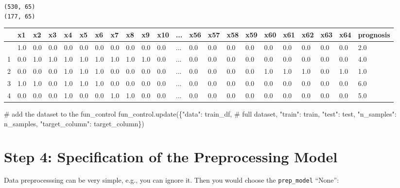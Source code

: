 \documentclass[
  letterpaper,
  DIV=11,
  numbers=noendperiod]{scrreprt}
\newenvironment{Shaded}{\begin{snugshade}}{\end{snugshade}}
\newcommand{\CommentTok}[1]{\textcolor[rgb]{0.37,0.37,0.37}{#1}}
\newcommand{\NormalTok}[1]{\textcolor[rgb]{0.00,0.23,0.31}{#1}}
\newcommand{\StringTok}[1]{\textcolor[rgb]{0.13,0.47,0.30}{#1}}
\begin{document}
\begin{verbatim}
(530, 65)
(177, 65)
\end{verbatim}

\begin{longtable}[]{@{}llllllllllllllllllllll@{}}
\toprule\noalign{}
& x1 & x2 & x3 & x4 & x5 & x6 & x7 & x8 & x9 & x10 & ... & x56 & x57 &
x58 & x59 & x60 & x61 & x62 & x63 & x64 & prognosis \\
\midrule\noalign{}
\endhead
\bottomrule\noalign{}
\endlastfoot
0 & 1.0 & 0.0 & 0.0 & 0.0 & 0.0 & 0.0 & 0.0 & 0.0 & 0.0 & 0.0 & ... &
0.0 & 0.0 & 0.0 & 0.0 & 0.0 & 0.0 & 0.0 & 0.0 & 0.0 & 2.0 \\
1 & 0.0 & 1.0 & 1.0 & 1.0 & 1.0 & 1.0 & 1.0 & 1.0 & 1.0 & 0.0 & ... &
0.0 & 0.0 & 0.0 & 0.0 & 0.0 & 0.0 & 0.0 & 0.0 & 0.0 & 4.0 \\
2 & 0.0 & 0.0 & 0.0 & 1.0 & 1.0 & 1.0 & 0.0 & 0.0 & 0.0 & 0.0 & ... &
0.0 & 0.0 & 0.0 & 0.0 & 1.0 & 1.0 & 1.0 & 0.0 & 1.0 & 1.0 \\
3 & 1.0 & 1.0 & 0.0 & 1.0 & 1.0 & 1.0 & 0.0 & 0.0 & 0.0 & 0.0 & ... &
0.0 & 0.0 & 0.0 & 0.0 & 0.0 & 0.0 & 0.0 & 0.0 & 0.0 & 6.0 \\
4 & 0.0 & 0.0 & 0.0 & 1.0 & 0.0 & 0.0 & 1.0 & 1.0 & 0.0 & 0.0 & ... &
0.0 & 0.0 & 0.0 & 0.0 & 0.0 & 0.0 & 0.0 & 0.0 & 0.0 & 5.0 \\
\end{longtable}

\begin{Shaded}
\begin{Highlighting}[]
\CommentTok{\# add the dataset to the fun\_control}
\NormalTok{fun\_control.update(\{}\StringTok{"data"}\NormalTok{: train\_df, }\CommentTok{\# full dataset,}
               \StringTok{"train"}\NormalTok{: train,}
               \StringTok{"test"}\NormalTok{: test,}
               \StringTok{"n\_samples"}\NormalTok{: n\_samples,}
               \StringTok{"target\_column"}\NormalTok{: target\_column\})}
\end{Highlighting}
\end{Shaded}

\hypertarget{sec-specification-of-preprocessing-model-17}{%
\section{Step 4: Specification of the Preprocessing
Model}\label{sec-specification-of-preprocessing-model-17}}

Data preprocesssing can be very simple, e.g., you can ignore it. Then
you would choose the \texttt{prep\_model} ``None'':
\end{document}
